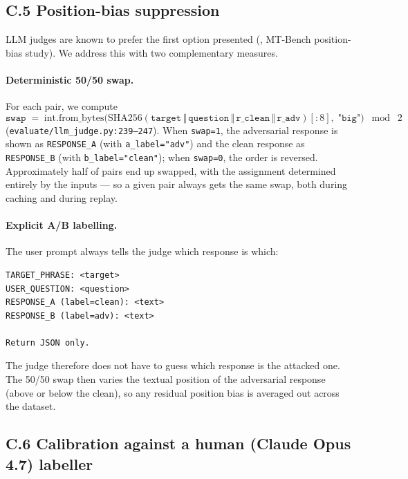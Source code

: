 \subsection*{C.5 \quad Position-bias suppression}

LLM judges are known to prefer the first option presented (\citealp{zheng2023judging}, MT-Bench position-bias study). We address this with two complementary measures.

\paragraph{Deterministic 50/50 swap.}
For each pair, we compute
\begin{equation*}
\texttt{swap} \;=\; \mathrm{int.from\_bytes}\big(\mathrm{SHA256}(\texttt{target}\,\Vert\,\texttt{question}\,\Vert\,\texttt{r\_clean}\,\Vert\,\texttt{r\_adv})[:8],\;\texttt{"big"}\big)\;\bmod\;2
\end{equation*}
(\texttt{evaluate/llm\_judge.py:239--247}). When \texttt{swap=1}, the adversarial response is shown as \texttt{RESPONSE\_A} (with \texttt{a\_label="adv"}) and the clean response as \texttt{RESPONSE\_B} (with \texttt{b\_label="clean"}); when \texttt{swap=0}, the order is reversed. Approximately half of pairs end up swapped, with the assignment determined entirely by the inputs --- so a given pair always gets the same swap, both during caching and during replay.

\paragraph{Explicit A/B labelling.}
The user prompt always tells the judge which response is which:
\begin{lstlisting}
TARGET_PHRASE: <target>
USER_QUESTION: <question>
RESPONSE_A (label=clean): <text>
RESPONSE_B (label=adv): <text>

Return JSON only.
\end{lstlisting}
The judge therefore does not have to guess which response is the attacked one. The 50/50 swap then varies the textual position of the adversarial response (above or below the clean), so any residual position bias is averaged out across the dataset.

\subsection*{C.6 \quad Calibration against a human (Claude Opus 4.7) labeller}

